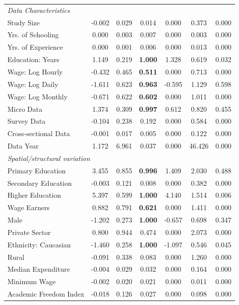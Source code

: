 {\begin{singlespace}
\begin{notsotiny}
\begin{longtable}{
@{\hskip\tabcolsep\extracolsep\fill}
l
*{6}{c}
}
\multicolumn{7}{l}{\emph{Data Characteristics}}\\
Study Size & -0.002 & 0.029 & 0.014 & 0.000 & 0.373 & 0.000 \\
Yrs. of Schooling & 0.000 & 0.003 & 0.007 & 0.000 & 0.003 & 0.000 \\
Yrs. of Experience & 0.000 & 0.001 & 0.006 & 0.000 & 0.013 & 0.000 \\
Education: Years & 1.149 & 0.219 & \textbf{1.000} & 1.328 & 0.619 & 0.032 \\
Wage: Log Hourly & -0.432 & 0.465 & \textbf{0.511} & 0.000 & 0.713 & 0.000 \\
Wage: Log Daily & -1.611 & 0.623 & \textbf{0.963} & -0.595 & 1.129 & 0.598 \\
Wage: Log Monthly & -0.671 & 0.622 & \textbf{0.602} & 0.000 & 1.011 & 0.000 \\
Micro Data & 1.374 & 0.309 & \textbf{0.997} & 0.612 & 0.820 & 0.455 \\
Survey Data & -0.104 & 0.238 & 0.192 & 0.000 & 0.584 & 0.000 \\
Cross-sectional Data & -0.001 & 0.017 & 0.005 & 0.000 & 0.122 & 0.000 \\
Data Year & 1.172 & 6.961 & 0.037 & 0.000 & 46.426 & 0.000 \\
\midrule

\multicolumn{7}{l}{\emph{Spatial/structural variation}}\\
Primary Education & 3.455 & 0.855 & \textbf{0.996} & 1.409 & 2.030 & 0.488 \\
Secondary Education & -0.003 & 0.121 & 0.008 & 0.000 & 0.382 & 0.000 \\
Higher Education & 5.397 & 0.599 & \textbf{1.000} & 4.140 & 1.514 & 0.006 \\
Wage Earners & 0.882 & 0.791 & \textbf{0.621} & 0.000 & 1.411 & 0.000 \\
Male & -1.202 & 0.273 & \textbf{1.000} & -0.657 & 0.698 & 0.347 \\
Private Sector & 0.800 & 0.944 & 0.474 & 0.000 & 2.073 & 0.000 \\
Ethnicity: Caucasian & -1.460 & 0.258 & \textbf{1.000} & -1.097 & 0.546 & 0.045 \\
Rural & -0.091 & 0.338 & 0.083 & 0.000 & 1.260 & 0.000 \\
Median Expenditure & -0.004 & 0.029 & 0.032 & 0.000 & 0.164 & 0.000 \\
Minimum Wage & -0.002 & 0.020 & 0.021 & 0.000 & 0.011 & 0.000 \\
Academic Freedom Index & -0.018 & 0.126 & 0.027 & 0.000 & 0.098 & 0.000 \\
\midrule


\end{longtable}
\end{notsotiny}
\end{singlespace}}
